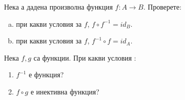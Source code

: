 \begin{problem}
  Нека а дадена произволна функция $f:A \to B$.
  Проверете:
  \begin{enumerate}[a)]
  \item
    при какви условия за $f$, $f\circ f^{-1} = id_{B}$.
  \item
     при какви условия за $f$, $f^{-1}\circ f = id_{A}$.
  \end{enumerate}
\end{problem}

\begin{problem}%
  Нека $f,g$ са функции. При какви условия :
  \begin{enumerate}
  \item
    $f^{-1}$ е функция?
  \item
    $f\circ g$ е инективна функция?
  \end{enumerate}
\end{problem}

